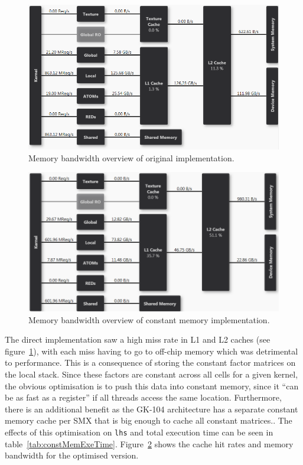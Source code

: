 \documentclass[11pt, oneside, a4paper]{article}
\begin{document}
\begin{figure}[p]
	\begin{center}
		\includegraphics[width=\textwidth]{"Original nonconst LHS memory overview BW"}
	\end{center}
	\caption{Memory bandwidth overview of original implementation.}
	\label{fig:membBWorig}
\end{figure}

\begin{figure}[p]
	\begin{center}
		\includegraphics[width=\textwidth]{"LHS memory overview BW"}
	\end{center}
	\caption{Memory bandwidth overview of constant memory implementation.}
	\label{fig:membBWfinal}
\end{figure}

The direct implementation saw a high miss rate in L1 and L2 caches (see figure~\ref{fig:membBWorig}), with each miss having to go to off-chip memory which was detrimental to performance. This is a consequence of storing the constant factor matrices on the local stack. Since these factors are constant across all cells for a given kernel, the obvious optimisation is to push this data into constant memory, since it ``can be as fast as a register''\cite{Best Practices} if all threads access the same location. Furthermore, there is an additional benefit as the GK-104 architecture has a separate constant memory cache per SMX that is big enough to cache all constant matrices.. The effects of this optimisation on \texttt{lhs} and total execution time can be seen in table~\ref{tab:constMemExeTime}. Figure~\ref{fig:membBWfinal} shows the cache hit rates and memory bandwidth for the optimised version.
\end{document}
